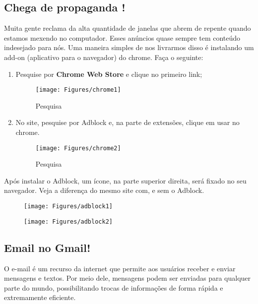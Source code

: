 \documentclass[hidelinks,12pt]{article}
\begin{document}
		\subsection{Chega de propaganda !}

		Muita gente reclama da alta quantidade de janelas que abrem de repente quando estamos mexendo no computador. Esses anúncios quase sempre tem conteúdo indesejado para nós. Uma maneira simples de nos livrarmos disso é instalando um add-on (aplicativo para o navegador) do chrome. Faça o seguinte:

		\begin{enumerate}
			\item Pesquise por \textbf{Chrome Web Store} e clique no primeiro link;

			\begin{figure}[!h]
				\centering
				\texttt{[image: Figures/chrome1]}
				\label{fig:chrome1}
				\caption{Pesquisa}
			\end{figure}

			\item No site, pesquise por Adblock e, na parte de extensões, clique em usar no chrome.

			\begin{figure}[!h]
				\centering
				\texttt{[image: Figures/chrome2]}
				\label{fig:chrome2}
				\caption{Pesquisa}
			\end{figure}

		\end{enumerate}

		Após instalar o Adblock, um ícone, na parte superior direita, será fixado no seu navegador. Veja a diferença do mesmo site com, e sem o Adblock.

		\begin{figure}[!htbp]
			\centering
			\begin{minipage}[b]{0.5\textwidth}
				\texttt{[image: Figures/adblock1]}\\

			\end{minipage}
			\hfill
			\begin{minipage}[b]{0.5\textwidth}
				\texttt{[image: Figures/adblock2]}

			\end{minipage}
		\end{figure}


		\newpage
	\subsection{Email no Gmail!}
		 O e-mail é um recurso da internet que permite aos usuários receber e enviar mensagens e textos. Por meio dele, mensagens podem ser enviadas para qualquer parte do mundo, possibilitando trocas de informações de forma rápida e extremamente eficiente.
\end{document}
